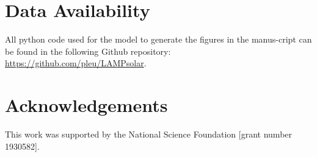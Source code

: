 \documentclass[preprint,12pt]{elsarticle}
\begin{document}











%
%

\section{Data Availability}

All python code used for the model to generate the figures in the manus-cript can be found in the following Github repository: \\ \url{https://github.com/pleu/LAMPsolar}.

\section{Acknowledgements}
This work was supported by the National Science Foundation [grant number 1930582].





\end{document}

